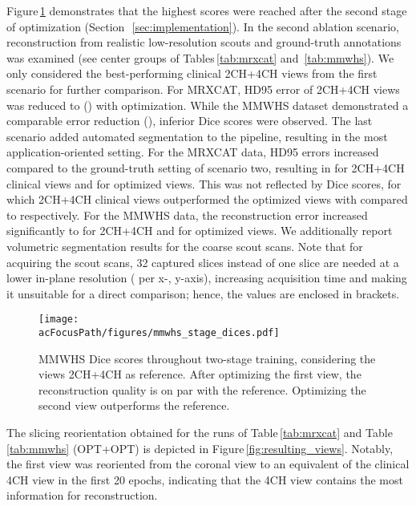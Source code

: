     Figure\,\ref{fig:mmwhs_stage_dices} demonstrates that the highest scores were reached after the second stage of optimization (Section~\,\ref{sec:implementation}).
    In the second ablation scenario, reconstruction from realistic low-resolution scouts and ground-truth annotations was examined (see center groups of Tables\,\ref{tab:mrxcat} and \,\ref{tab:mmwhs}). We only considered the best-performing clinical 2CH+4CH views from the first scenario for further comparison.
    For MRXCAT,  HD95 error of 2CH+4CH views was reduced to  () with optimization.
    While the MMWHS dataset demonstrated a comparable error reduction (), inferior Dice scores were observed.
    The last scenario added automated segmentation to the pipeline, resulting in the most application-oriented setting.
    For the MRXCAT data, HD95 errors increased compared to the ground-truth setting of scenario two, resulting in  for 2CH+4CH clinical views and  for optimized views. This was not reflected by Dice scores, for which 2CH+4CH clinical views outperformed the optimized views with  compared to  respectively.
    For the MMWHS data, the reconstruction error increased significantly to  for 2CH+4CH and  for optimized views.
    We additionally report volumetric segmentation results for the coarse scout scans. Note that for acquiring the scout scans, 32 captured slices instead of one slice are needed at a lower in-plane resolution ( per x-, y-axis), increasing acquisition time and making it unsuitable for a direct comparison; hence, the values are enclosed in brackets.


        \begin{figure}

     \texttt{[image: \\acFocusPath/figures/mmwhs\_stage\_dices.pdf]}
        \caption{
        MMWHS Dice scores throughout two-stage training, considering the views 2CH+4CH as reference. After optimizing the first view, the reconstruction quality is on par with the reference. Optimizing the second view outperforms the reference.}
        \label{fig:mmwhs_stage_dices}
    \end{figure}

    The slicing reorientation obtained for the runs of Table\,\ref{tab:mrxcat} and Table \,\ref{tab:mmwhs} (OPT+OPT) is depicted in Figure\,\ref{fig:resulting_views}. Notably, the first view was reoriented from the coronal view to an equivalent of the clinical 4CH view in the first 20 epochs, indicating that the 4CH view contains the most information for reconstruction.

